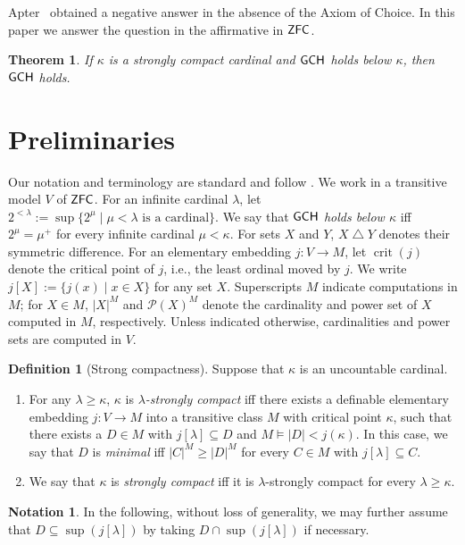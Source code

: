 \documentclass[11pt,reqno]{amsart}
\newtheorem{mainthm}{Theorem}
\theoremstyle{definition}
\newtheorem{defn}[thm]{Definition}
\newtheorem{notation}[thm]{Notation}
\theoremstyle{remark}
\newcommand\symdiff{\mathbin{\bigtriangleup}}
\renewcommand{\mid}{\mathrel{|}\allowbreak}
\DeclareMathOperator{\crit}{crit}
\newcommand*\axiomfont[1]{\textsf{\textup{#1}}}
\newcommand\zfc{\axiomfont{ZFC}}
\newcommand\gch{\axiomfont{GCH}}
\begin{document}
Apter~\cite{Apter2000} obtained a negative answer in the absence of the Axiom of Choice.
In this paper we answer the question in the affirmative in $\zfc$.

\begin{mainthm}\label{thma}
    If $\kappa$ is a strongly compact cardinal and $\gch$ holds below $\kappa$,
    then $\gch$ holds.
\end{mainthm}


\section{Preliminaries}\label{sec:prelim}

Our notation and terminology are standard and follow \cite{Kanamori}.
We work in a transitive model $V$ of $\zfc$.
For an infinite cardinal $\lambda$, let
$2^{<\lambda}:=\sup\{2^\mu\mid \mu<\lambda\text{ is a cardinal}\}$.
We say that \emph{$\gch$ holds below $\kappa$} iff $2^\mu=\mu^+$ for every infinite cardinal $\mu<\kappa$.
For sets $X$ and $Y$, $X\symdiff Y$ denotes their symmetric difference.
For an elementary embedding $j:V\rightarrow M$,
let $\crit(j)$ denote the critical point of $j$, i.e., the least ordinal moved by $j$.
We write $j[X]:=\{j(x)\mid x\in X\}$ for any set $X$.
Superscripts $M$ indicate computations in $M$; for $X\in M$, $|X|^M$ and $\mathcal P(X)^M$ denote the cardinality and power set of $X$ computed in $M$, respectively.
Unless indicated otherwise, cardinalities and power sets are computed in $V$.

\begin{defn}[Strong compactness]\label{dfine}
    Suppose that $\kappa$ is an uncountable cardinal.
    \begin{enumerate}
        \item For any $\lambda\ge\kappa$, $\kappa$ is \emph{$\lambda$-strongly compact} iff there exists a definable elementary embedding $j:V\rightarrow M$ into a transitive class $M$ with critical point $\kappa$,
              such that there exists a $D\in M$ with $j[\lambda]\subseteq D$ and $M\models |D|<j(\kappa)$.
              In this case, we say that $D$ is \emph{minimal} iff $|C|^M\ge|D|^M$ for every $C\in M$ with $j[\lambda]\subseteq C$.
        \item We say that $\kappa$ is \emph{strongly compact} iff it is $\lambda$-strongly compact for every $\lambda\ge\kappa$.
    \end{enumerate}
\end{defn}

\begin{notation}
    In the following, without loss of generality,
    we may further assume that $D\subseteq \sup(j[\lambda])$ by taking $D \cap \sup(j[\lambda])$ if necessary.
\end{notation}
\end{document}
